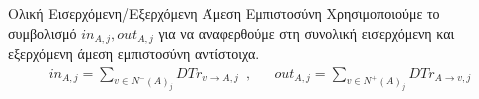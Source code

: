 {}
\begin{definitiongr}{Ολική Εισερχόμενη/Εξερχόμενη Άμεση Εμπιστοσύνη}
\label{inouttrust}
  Χρησιμοποιούμε το συμβολισμό $in_{A, j}, out_{A, j}$ για να αναφερθούμε στη συνολική εισερχόμενη και εξερχόμενη άμεση
  εμπιστοσύνη αντίστοιχα.
  \begin{align}
    in_{A, j} = \sum\limits_{v \in N^{-}\left(A\right)_j}DTr_{v \rightarrow A, j} \enspace,&&
    out_{A, j} = \sum\limits_{v \in N^{+}\left(A\right)_j}DTr_{A \rightarrow v, j}
  \end{align}
\end{definitiongr}
